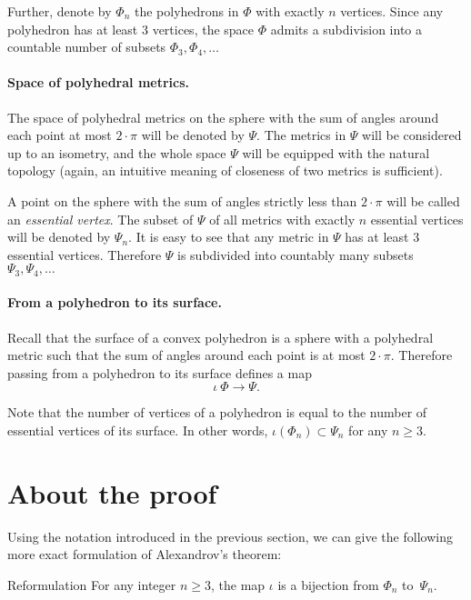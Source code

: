 Further, denote by $\Phi_n$ the polyhedrons in $\Phi$ with exactly $n$ vertices.
Since any polyhedron has at least 3 vertices, the space $\Phi$ admits a subdivision into a countable number of subsets $\Phi_3,\Phi_4,\dots$

\paragraph{Space of polyhedral metrics.}
The space of polyhedral metrics on the sphere with the sum of angles around each point at most $2\cdot\pi$ will be denoted by $\Psi$.
The metrics in $\Psi$ will be considered up to an isometry, and the whole space $\Psi$ will be equipped with the natural topology (again, an intuitive meaning of closeness of two metrics is sufficient).

A point on the sphere with the sum of angles strictly less than $2\cdot\pi$ will be called an \emph{essential vertex}.
The subset of $\Psi$ of all metrics with exactly $n$ essential vertices will be denoted by $\Psi_n$.
It is easy to see that any metric in $\Psi$ has at least 3 essential vertices.
Therefore $\Psi$ is subdivided into countably many subsets
 $\Psi_3,\Psi_4,\dots$

\paragraph{From a polyhedron to its surface.}

Recall that the surface of a convex polyhedron is a sphere with a polyhedral metric such that the sum of angles around each point is at most $2\cdot\pi$.
Therefore passing from a polyhedron to its surface defines a map
\[\iota\:\Phi\to \Psi.\]

Note that the number of vertices of a polyhedron is equal to the number of essential vertices of its surface.
In other words, $\iota(\Phi_n)\subset \Psi_n$ for any $n\ge 3$.

\section{About the proof}

Using the notation introduced in the previous section, we can give the following more exact formulation of Alexandrov's theorem: 

\begin{thm}{Reformulation}
For any integer $n\ge 3$,
the map $\iota$ is a bijection from $\Phi_n$ to~$\Psi_n$.
\end{thm}

